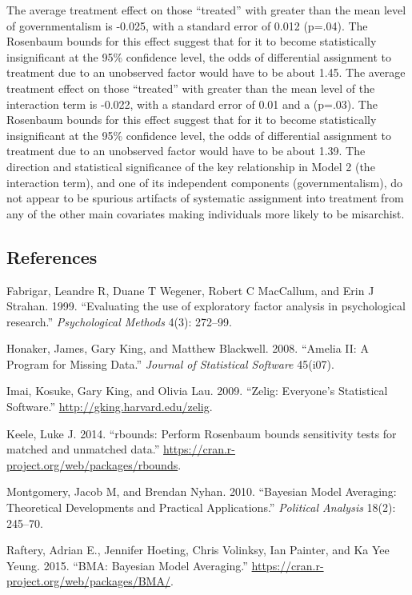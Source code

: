 \documentclass[12pt,]{article}
\begin{document}
The average treatment effect on those ``treated'' with greater than the
mean level of governmentalism is -0.025, with a standard error of 0.012
(p=.04). The Rosenbaum bounds for this effect suggest that for it to
become statistically insignificant at the 95\% confidence level, the
odds of differential assignment to treatment due to an unobserved factor
would have to be about 1.45. The average treatment effect on those
``treated'' with greater than the mean level of the interaction term is
-0.022, with a standard error of 0.01 and a (p=.03). The Rosenbaum
bounds for this effect suggest that for it to become statistically
insignificant at the 95\% confidence level, the odds of differential
assignment to treatment due to an unobserved factor would have to be
about 1.39. The direction and statistical significance of the key
relationship in Model 2 (the interaction term), and one of its
independent components (governmentalism), do not appear to be spurious
artifacts of systematic assignment into treatment from any of the other
main covariates making individuals more likely to be misarchist.

\clearpage

\subsection{References}

Fabrigar, Leandre R, Duane T Wegener, Robert C MacCallum, and Erin J
Strahan. 1999. ``Evaluating the use of exploratory factor analysis in
psychological research.'' \emph{Psychological Methods} 4(3): 272--99.

Honaker, James, Gary King, and Matthew Blackwell. 2008. ``Amelia II: A
Program for Missing Data.'' \emph{Journal of Statistical Software}
45(i07).

Imai, Kosuke, Gary King, and Olivia Lau. 2009. ``Zelig: Everyone's
Statistical Software.'' \url{http://gking.harvard.edu/zelig}.

Keele, Luke J. 2014. ``rbounds: Perform Rosenbaum bounds sensitivity
tests for matched and unmatched data.''
\url{https://cran.r-project.org/web/packages/rbounds}.

Montgomery, Jacob M, and Brendan Nyhan. 2010. ``Bayesian Model
Averaging: Theoretical Developments and Practical Applications.''
\emph{Political Analysis} 18(2): 245--70.

Raftery, Adrian E., Jennifer Hoeting, Chris Volinksy, Ian Painter, and Ka Yee Yeung. 2015. ``BMA: Bayesian Model Averaging.''
\url{https://cran.r-project.org/web/packages/BMA/}.
\end{document}
